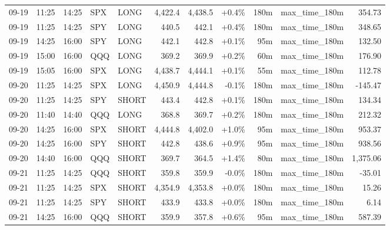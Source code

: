 \documentclass[11pt,a4paper,twoside]{article}
\begin{document}
\begin{center}
\begin{longtable}{>{\color{txtmain}}l l l l l r r r r >{\color{txtmain}}l r}
09-19 & 11:25 & 14:25 & SPX & LONG & 4,422.4 & 4,438.5 & \textcolor{wingreen}{+0.4\%} & 180m & max\_time\_180m & \textcolor{wingreen}{354.73} \\
09-19 & 11:25 & 14:25 & SPY & LONG & 440.5 & 442.1 & \textcolor{wingreen}{+0.4\%} & 180m & max\_time\_180m & \textcolor{wingreen}{348.65} \\
09-19 & 14:25 & 16:00 & SPY & LONG & 442.1 & 442.8 & \textcolor{wingreen}{+0.1\%} & 95m & max\_time\_180m & \textcolor{wingreen}{132.50} \\
09-19 & 15:00 & 16:00 & QQQ & LONG & 369.2 & 369.9 & \textcolor{wingreen}{+0.2\%} & 60m & max\_time\_180m & \textcolor{wingreen}{176.90} \\
09-19 & 15:05 & 16:00 & SPX & LONG & 4,438.7 & 4,444.1 & \textcolor{wingreen}{+0.1\%} & 55m & max\_time\_180m & \textcolor{wingreen}{112.78} \\
09-20 & 11:25 & 14:25 & SPX & LONG & 4,450.9 & 4,444.8 & \textcolor{lossred}{-0.1\%} & 180m & max\_time\_180m & \textcolor{lossred}{-145.47} \\
09-20 & 11:25 & 14:25 & SPY & SHORT & 443.4 & 442.8 & \textcolor{wingreen}{+0.1\%} & 180m & max\_time\_180m & \textcolor{wingreen}{134.34} \\
09-20 & 11:40 & 14:40 & QQQ & LONG & 368.8 & 369.7 & \textcolor{wingreen}{+0.2\%} & 180m & max\_time\_180m & \textcolor{wingreen}{212.32} \\
09-20 & 14:25 & 16:00 & SPX & SHORT & 4,444.8 & 4,402.0 & \textcolor{wingreen}{+1.0\%} & 95m & max\_time\_180m & \textcolor{wingreen}{953.37} \\
09-20 & 14:25 & 16:00 & SPY & SHORT & 442.8 & 438.6 & \textcolor{wingreen}{+0.9\%} & 95m & max\_time\_180m & \textcolor{wingreen}{938.56} \\
09-20 & 14:40 & 16:00 & QQQ & SHORT & 369.7 & 364.5 & \textcolor{wingreen}{+1.4\%} & 80m & max\_time\_180m & \textcolor{wingreen}{1,375.06} \\
09-21 & 11:25 & 14:25 & QQQ & SHORT & 359.8 & 359.9 & \textcolor{lossred}{-0.0\%} & 180m & max\_time\_180m & \textcolor{lossred}{-35.01} \\
09-21 & 11:25 & 14:25 & SPX & SHORT & 4,354.9 & 4,353.8 & \textcolor{wingreen}{+0.0\%} & 180m & max\_time\_180m & \textcolor{wingreen}{15.26} \\
09-21 & 11:25 & 14:25 & SPY & SHORT & 433.9 & 433.8 & \textcolor{wingreen}{+0.0\%} & 180m & max\_time\_180m & \textcolor{wingreen}{6.14} \\
09-21 & 14:25 & 16:00 & QQQ & SHORT & 359.9 & 357.8 & \textcolor{wingreen}{+0.6\%} & 95m & max\_time\_180m & \textcolor{wingreen}{587.39} \\

\end{longtable}
\end{center}
\end{document}
